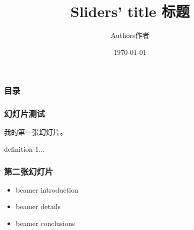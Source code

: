 \documentclass{beamer}
\title{Sliders' title 标题}
\author{Authors作者}
\date{\today}
\begin{document}
\begin{frame}
    \titlepage
\end{frame}
\begin{frame}
\frametitle{目录}
\tableofcontents
\end{frame}
\begin{frame}
\frametitle{幻灯片测试}
我的第一张幻灯片。
\begin{definition}
        definition 1...
\end{definition}
\end{frame}
\begin{frame}
\frametitle{第二张幻灯片}
\pause
\begin{itemize}
\item beamer introduction
\pause
\item beamer details
\pause
\item beamer conclusions
\end{itemize}
\end{frame}
\end{document}
